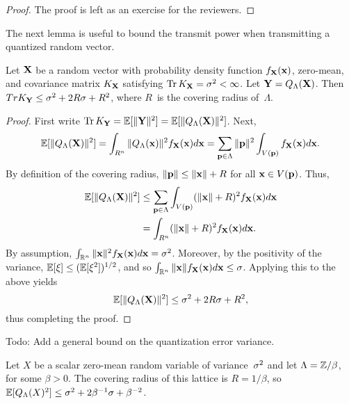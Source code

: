 \begin{proof}
  The proof is left as an exercise for the reviewers.
\end{proof}

The next lemma is useful to bound the transmit power when transmitting a
quantized random vector.
\begin{lemma}
  \label{lem:latquantvar}
  Let $\mathbf{X}$ be a random vector with probability density function $f_{\mathbf{X}}(\mathbf{x})$,
  zero-mean, and covariance matrix $K_{\mathbf{X}}$ satisfying $\operatorname{Tr} K_{\mathbf{X}} = {\sigma^2} <
  \infty$. Let $\mathbf{Y} = {Q_{\Lambda}}(\mathbf{X})$. Then $Tr K_{\mathbf{Y}} \le {\sigma^2} + 2R\sigma + R^2$, 
  where $R$~is the covering radius of~$\Lambda$.
\end{lemma}

\begin{proof}
  First write $\operatorname{Tr} K_{\mathbf{Y}} = \mathbb{E}[\|\mathbf{Y}\|^2] = \mathbb{E}[\|{Q_{\Lambda}}(\mathbf{X})\|^2]$. Next,
  \begin{equation*}
    \mathbb{E}[\|{Q_{\Lambda}}(\mathbf{X})\|^2] = \int_{R^n} \|{Q_{\Lambda}}(\mathbf{x})\|^2 f_{\mathbf{X}}(\mathbf{x}) d\mathbf{x}
    = \sum_{\mathbf{p} \in \Lambda} \|\mathbf{p}\|^2 \int_{V(\mathbf{p})} f_{\mathbf{X}}(\mathbf{x}) d\mathbf{x}.
  \end{equation*}
  By definition of the covering radius, $\|\mathbf{p}\| \le \|\mathbf{x}\| + R$ for all $\mathbf{x} \in
  V(\mathbf{p})$. Thus,
  \begin{align*}
    \mathbb{E}[\|{Q_{\Lambda}}(\mathbf{X})\|^2] &\le \sum_{\mathbf{p} \in \Lambda} \int_{V(\mathbf{p})} (\|\mathbf{x}\| + R)^2
    f_{\mathbf{X}}(\mathbf{x}) d\mathbf{x} \\
    &= \int_{R^n} (\|\mathbf{x}\| + R)^2 f_{\mathbf{X}}(\mathbf{x}) d\mathbf{x}.
  \end{align*}
  By assumption, $\int_{\mathbb{R}^n} \|\mathbf{x}\|^2 f_{\mathbf{X}}(\mathbf{x}) d\mathbf{x} = {\sigma^2}$. Moreover, by the
  positivity of the variance, $\mathbb{E}[\xi] \le (\mathbb{E}[\xi^2])^{1/2}$, and so
  $\int_{\mathbb{R}^n} \|\mathbf{x}\| f_{\mathbf{X}}(\mathbf{x}) d\mathbf{x} \le \sigma$. Applying this to the above
  yields
  \begin{equation*}
    \mathbb{E}[\|{Q_{\Lambda}}(\mathbf{X})\|^2] \le {\sigma^2} + 2R\sigma + R^2,
  \end{equation*}
  thus completing the proof.
\end{proof}

\begin{notebox}
  Todo: Add a general bound on the quantization error variance.
\end{notebox}

\begin{example}
  Let $X$ be a scalar zero-mean random variable of variance~${\sigma^2}$ and let
  $\Lambda = \mathbb{Z} / \beta$, for some $\beta > 0$. The covering radius of this
  lattice is $R = 1/\beta$, so $\mathbb{E}[{Q_{\Lambda}}(X)^2] \le {\sigma^2} + 2 \beta^{-1} \sigma +
  \beta^{-2}$.
\end{example}




